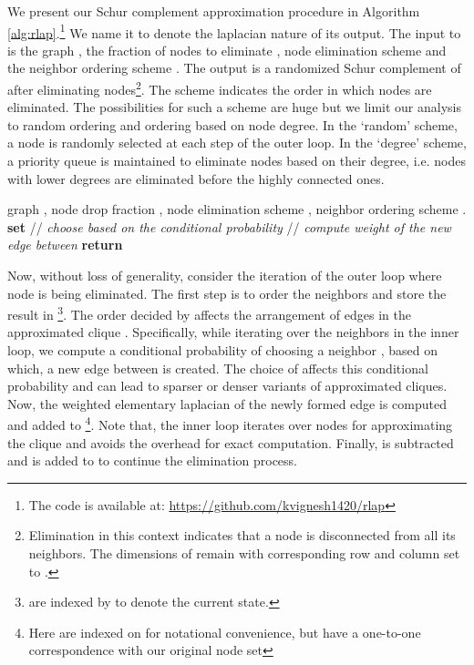 \documentclass{article}
\theoremstyle{plain}
\theoremstyle{definition}
\theoremstyle{remark}
\begin{document}
We present our Schur complement approximation procedure in Algorithm \ref{alg:rlap}.\footnote{The code is available at: \href{https://github.com/kvignesh1420/rlap}{https://github.com/kvignesh1420/rlap}} We name it  to denote the laplacian nature of its output. The input to  is the graph , the fraction of nodes to eliminate , node elimination scheme  and the neighbor ordering scheme . The output is a randomized Schur complement of  after eliminating  nodes\footnote{Elimination in this context indicates that a node is disconnected from all its neighbors. The dimensions of  remain  with corresponding row and column set to .}. The scheme  indicates the order in which  nodes are eliminated. The possibilities for such a scheme are huge but we limit our analysis to random ordering and ordering based on node degree. In the `random' scheme, a node is randomly selected at each step of the outer loop. In the `degree' scheme, a priority queue is maintained to eliminate nodes based on their degree, i.e. nodes with lower degrees are eliminated before the highly connected ones.

\begin{algorithm}[tb]
  \caption{}
  \label{alg:rlap}
\begin{algorithmic}
   graph , node drop fraction ,  node elimination scheme , neighbor ordering scheme .
  \STATE \textbf{set} 
  \REPEAT
  \STATE 
  \STATE 
  \STATE // \textit{choose  based on the conditional probability}
  \STATE 
  \STATE // \textit{compute weight of the new edge between }
  \STATE 
  \STATE 
  \ENDFOR
  \STATE  
  \STATE 
  \STATE \textbf{return} 
\end{algorithmic}
\end{algorithm}

Now, without loss of generality, consider the  iteration of the outer loop where node  is being eliminated. The first step is to order the neighbors  and store the result in  \footnote{ are indexed by  to denote the current state.}. The order decided by  affects the arrangement of edges in the approximated clique . Specifically, while iterating over the neighbors  in the inner loop, we compute a conditional probability  of choosing a neighbor , based on which, a new edge between  is created. The choice of  affects this conditional probability and can lead to sparser or denser variants of approximated cliques. Now, the weighted elementary laplacian  of the newly formed edge  is computed and added to  \footnote{Here  are indexed on  for notational convenience, but have a one-to-one correspondence with our original node set }. Note that, the inner loop iterates over  nodes for approximating the clique and avoids the  overhead for exact computation. Finally,  is subtracted and  is added to  to continue the elimination process.
\end{document}
